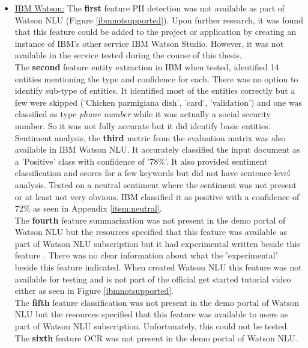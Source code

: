 \clearpage
\newpage
\begin{itemize} 
    \item \underline{IBM Watson:}
    The \textbf{first} feature \acs{PII} detection was not available as part of Watson \acs{NLU} (Figure \ref{ibmnotsupported}). Upon further research, it was found that this feature could be added to the project or application by creating an instance of IBM's other service IBM Watson Studio. However, it was not available in the service tested during the course of this thesis.\\
    The \textbf{second} feature entity extraction in IBM when tested, identified 14 entities mentioning the type and confidence for each. There was no option to identify sub-type of entities. It identified most of the entities correctly but a few were skipped ('Chicken parmigiana dish', 'card', 'validation') and one was classified as type \textit{phone number} while it was actually a social security number. So it was not fully accurate but it did identify basic entities.\\
    Sentiment analysis, the \textbf{third} metric from the evaluation matrix was also available in IBM Watson \acs{NLU}. It accurately classified the input document as a 'Positive' class with confidence of '78\%'. It also provided sentiment classification and scores for a few keywords but did not have sentence-level analysis. Tested on a neutral sentiment where the sentiment was not present or at least not very obvious. IBM classified it as positive with a confidence of 72\% as seen in Appendix \ref{item:neutral}.\\
    The \textbf{fourth} feature summarization was not present in the demo portal of Watson \acs{NLU} but the resources \cite{watsonnlu} specified that this feature was available as part of Watson \acs{NLU} subscription but it had experimental written beside this feature \cite{ibmsumm}. There was no clear information about what the 'experimental' beside this feature indicated. When created Watson \acs{NLU} this feature was not available for testing and is not part of the official get started tutorial video either as seen in Figure \ref{ibmnotsupported}.\\
    The \textbf{fifth} feature classification was not present in the demo portal of Watson \acs{NLU} but the resources \cite{watsonnlu} specified that this feature was available to users as part of Watson \acs{NLU} subscription. Unfortunately, this could not be tested.\\
    The \textbf{sixth} feature \ac{OCR} was not present in the demo portal of Watson \acs{NLU}.\\

\end{itemize}
